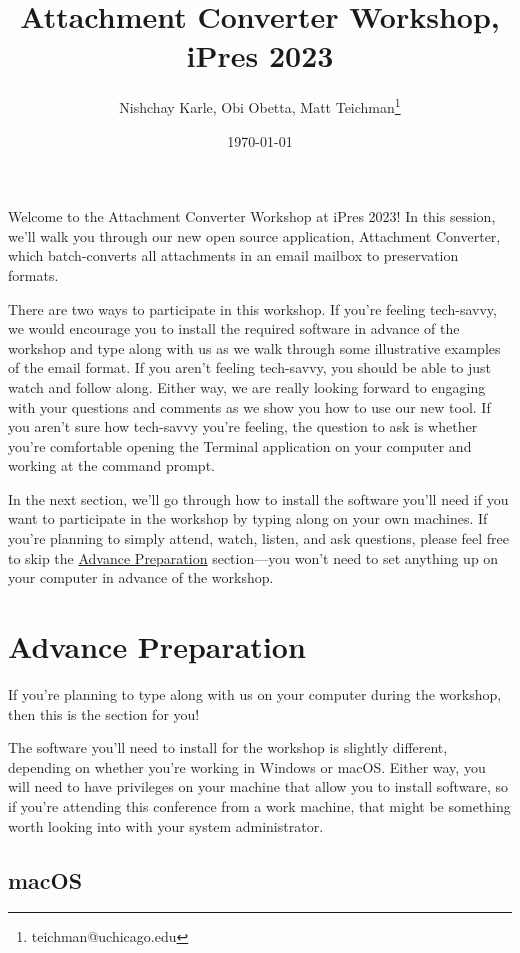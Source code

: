 \documentclass[11pt]{article}
\author{Nishchay Karle, Obi Obetta, Matt Teichman\thanks{teichman@uchicago.edu}}
\date{\today}
\title{Attachment Converter Workshop, iPres 2023}
\begin{document}
\maketitle
Welcome to the Attachment Converter Workshop at iPres 2023!  In this
session, we'll walk you through our new open source application,
Attachment Converter, which batch-converts all attachments in an email
mailbox to preservation formats.

There are two ways to participate in this workshop.  If you're feeling
tech-savvy, we would encourage you to install the required software in
advance of the workshop and type along with us as we walk through some
illustrative examples of the email format.  If you aren't feeling
tech-savvy, you should be able to just watch and follow along.  Either
way, we are really looking forward to engaging with your questions and
comments as we show you how to use our new tool.  If you aren't sure
how tech-savvy you're feeling, the question to ask is whether you're
comfortable opening the Terminal application on your computer and
working at the command prompt.

In the next section, we'll go through how to install the software
you'll need if you want to participate in the workshop by typing along
on your own machines.  If you're planning to simply attend, watch,
listen, and ask questions, please feel free to skip the \hyperref[orgb850bad]{Advance
Preparation} section---you won't need to set anything up on your
computer in advance of the workshop.

\section*{Advance Preparation \label{orgb850bad}}
\label{sec:org41fbcab}

If you're planning to type along with us on your computer during the
workshop, then this is the section for you!

The software you'll need to install for the workshop is slightly
different, depending on whether you're working in Windows or macOS.
Either way, you will need to have privileges on your machine that
allow you to install software, so if you're attending this conference
from a work machine, that might be something worth looking into with
your system administrator.

\subsection*{macOS}
\label{sec:orgb658726}
\end{document}
